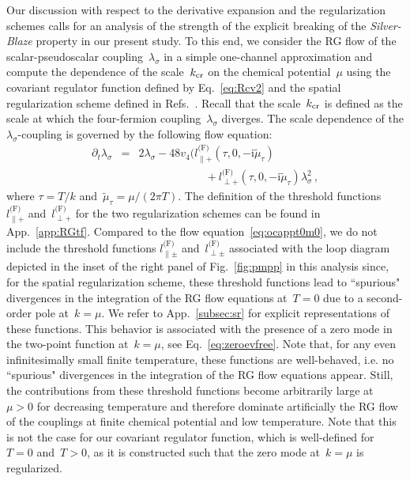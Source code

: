\documentclass[prd,english,preprintnumbers,amsmath,amssymb,nofootinbib,twocolumn,superscriptaddress]{revtex4-1}
\newcommand{\I}{\mathrm{i}}
\newcommand{\be}{\begin{eqnarray}}
\newcommand{\ee}{\end{eqnarray}}
\newcommand{\nn}{\nonumber }
\begin{document}
{{Our discussion with respect to the derivative expansion and the regularization
schemes calls for an analysis of the strength of the explicit
breaking of the {\it Silver-Blaze} property in our present study.
To this end, we consider the RG flow of the scalar-pseudoscalar coupling~$\lambda_{\sigma}$ in a
simple one-channel approximation and compute the dependence of the scale~$k_{\rm cr}$ 
on the chemical potential~$\mu$ using the covariant regulator function 
defined by Eq.~\eqref{eq:Rcv2} and the spatial 
{regularization scheme defined} in Refs.~\cite{Braun:2003ii,Schaefer:2004en,Blaizot:2006rj,Litim:2006ag}. 
Recall that the scale~$k_{\rm cr}$
is defined as the scale at which the four-fermion coupling~$\lambda_{\sigma}$ diverges. The scale dependence of the $\lambda_{\sigma}$-coupling 
is governed by the following flow {equation:
%
\be
\partial_t \lambda_{\sigma} &=& 2\lambda_{\sigma} - 48v_4 ( 
l^{\text{(F)}}_{\parallel +}(\tau,0,-\I\tilde{\mu}_{\tau})\nn\\
&& \qquad\qquad\qquad + l^{\text{(F)}}_{\perp +}(\tau,0,-\I\tilde{\mu}_{\tau})
 \lambda_{\sigma}^2\,,\label{eq:SB1c}
\ee
%
where} $\tau=T/k$ and~$\tilde{\mu}_{\tau}=\mu/(2\pi T)$. The 
definition of the threshold functions~$l^{\text{(F)}}_{\parallel +}$ and~$l^{\text{(F)}}_{\perp +}$ 
for the two regularization schemes can be found in App.~\ref{app:RGtf}. 
Compared to the flow equation~\eqref{eq:ocappt0m0}, we do not include 
the threshold functions $l^{\text{(F)}}_{\parallel \pm}$ and~$l^{\text{(F)}}_{\perp \pm}$ associated with the loop diagram depicted 
in the inset of the right panel of Fig.~\ref{fig:pmpp} in this analysis
since, for the spatial regularization scheme, these threshold functions
lead to ``spurious" divergences in the integration of 
the RG flow equations at~$T=0$ due to a second-order 
pole at~$k=\mu$. We refer to  
App.~\ref{subsec:sr} for explicit representations of these functions. 
This behavior is associated with the presence of a zero mode in the two-point function at~$k=\mu$,
see Eq.~\eqref{eq:zeroevfree}. 
Note that, for any even infinitesimally small finite temperature, these functions are well-behaved, i.e. no
``spurious" divergences in the integration of
the RG flow equations appear. 
Still, the contributions from these threshold functions
become arbitrarily large at~$\mu>0$ for decreasing temperature and therefore dominate artificially the 
RG flow of the couplings at finite chemical potential and low temperature.
Note that this is not the case for our covariant regulator function, which is well-defined for~$T=0$ and~$T>0$,
as it is constructed such that the zero mode at~$k=\mu$ is regularized.

}}
\end{document}
